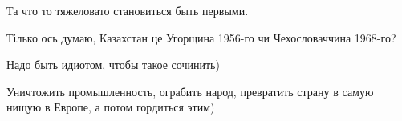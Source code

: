 \begin{itemize}
Та что то тяжеловато становиться быть первыми.

Тілько ось думаю, Казахстан це Угорщина 1956-го чи Чехословаччина 1968-го?


Надо быть идиотом, чтобы такое сочинить)

Уничтожить промышленность, ограбить народ, превратить страну в самую нищую в
Европе, а потом гордиться этим)



\end{itemize} %
